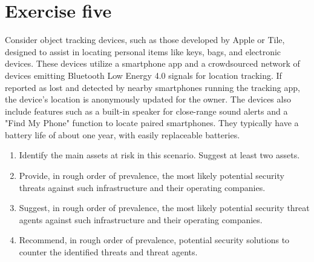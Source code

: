 \section{Exercise five}

Consider object tracking devices, such as those developed by Apple or Tile, designed to assist in locating personal items like keys, bags, and electronic devices. 
These devices utilize a smartphone app and a crowdsourced network of devices emitting Bluetooth Low Energy 4.0 signals for location tracking. 
If reported as lost and detected by nearby smartphones running the tracking app, the device's location is anonymously updated for the owner. 
The devices also include features such as a built-in speaker for close-range sound alerts and a "Find My Phone" function to locate paired smartphones. 
They typically have a battery life of about one year, with easily replaceable batteries.
\begin{enumerate}
    \item Identify the main assets at risk in this scenario. Suggest at least two assets.
    \item Provide, in rough order of prevalence, the most likely potential security threats against such infrastructure and their operating companies.
    \item Suggest, in rough order of prevalence, the most likely potential security threat agents against such infrastructure and their operating companies.
    \item Recommend, in rough order of prevalence, potential security solutions to counter the identified threats and threat agents.
\end{enumerate}

